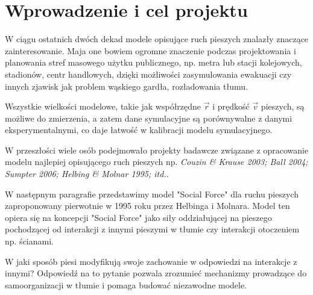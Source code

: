 \chapter{Wprowadzenie i cel projektu}
\hspace{4ex}W ciągu ostatnich dwóch dekad modele opisujące ruch pieszych znalazły znaczące zainteresowanie. Maja one bowiem ogromne znaczenie podczas projektowania i planowania stref masowego użytku publicznego, np. metra lub stacji kolejowych, stadionów, centr handlowych, dzięki możliwości zasymulowania ewakuacji czy innych zjawisk jak problem wąskiego gardła, rozładowania tłumu.

Wszystkie wielkości modelowe, takie jak współrzędne $\vec{r}$ i prędkość $\vec{v}$ pieszych, są możliwe do zmierzenia, a zatem dane symulacyjne są porównywalne z danymi eksperymentalnymi, co daje łatwość w kalibracji modelu symulacyjnego. 
\par \medskip
W przeszłości wiele osób podejmowało projekty badawcze związane z opracowanie modelu najlepiej opisującego ruch pieszych np. 
\textit{Couzin \& Krause 2003; Ball 2004; Sumpter 2006; Helbing \& Molnar 1995; itd.}. 

W następnym paragrafie przedstawimy model "Social Force" dla ruchu pieszych zaproponowany pierwotnie w 1995 roku przez Helbinga i Molnara. Model ten opiera się na koncepcji "Social Force" jako siły oddziałującej na pieszego pochodzącej od interakcji z innymi pieszymi w tłumie czy interakcji otoczeniem np. ścianami.

W jaki sposób piesi modyfikują swoje zachowanie w odpowiedzi na interakcje z innymi? Odpowiedź na to pytanie pozwala zrozumieć mechanizmy prowadzące do samoorganizacji w tłumie i pomaga budować niezawodne modele.
